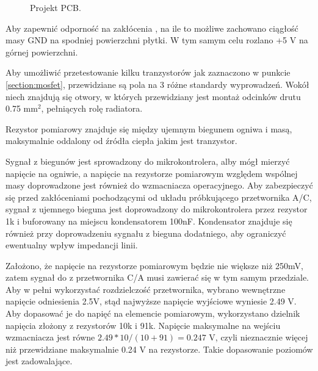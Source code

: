 \documentclass[polish,engineer]{polsl-msth}
\begin{document}
\begin{figure}[hbtp]
     \caption{Projekt PCB. \label{img:pcb_colored}}
\end{figure}

Aby zapewnić odporność na zakłócenia , na ile to możliwe zachowano ciągłość masy GND na spodniej powierzchni płytki. W tym samym celu rozlano +5 V na górnej powierzchni. 

Aby umożliwić przetestowanie kilku tranzystorów jak zaznaczono w punkcie \ref{section:mosfet}, przewidziane są pola na 3 różne standardy wyprowadzeń. Wokół niech znajdują się otwory, w których przewidziany jest montaż odcinków drutu 0.75 mm$^2$, pełniących rolę radiatora.

Rezystor pomiarowy znajduje się między ujemnym biegunem ogniwa i masą, maksymalnie oddalony od źródła ciepła jakim jest tranzystor. 

Sygnał z biegunów jest sprowadzony do mikrokontrolera, alby mógł mierzyć napięcie na ogniwie, a napięcie na rezystorze pomiarowym względem wspólnej masy doprowadzone jest również do wzmacniacza operacyjnego. Aby zabezpieczyć się przed zakłóceniami pochodzącymi od układu próbkującego przetwornika A/C, sygnał z ujemnego bieguna jest doprowadzony do mikrokontrolera przez rezystor 1k i buforowany na miejscu kondensatorem 100nF. Kondensator znajduje się również przy doprowadzeniu sygnału z bieguna dodatniego, aby ograniczyć ewentualny wpływ impedancji linii.

Założono, że napięcie na rezystorze pomiarowym będzie nie większe niż 250mV, zatem sygnał do z przetwornika C/A musi zawierać się w tym samym przedziale. Aby w pełni wykorzystać rozdzielczość przetwornika, wybrano wewnętrzne napięcie odniesienia 2.5V, stąd najwyższe napięcie wyjściowe wyniesie 2.49 V. Aby dopasować je do napięć na elemencie pomiarowym, wykorzystano dzielnik napięcia złożony z rezystorów 10k i 91k. Napięcie maksymalne na wejściu wzmacniacza jest równe $2.49*10/(10+91) = 0.247$ V, czyli nieznacznie więcej niż przewidziane maksymalnie 0.24 V na rezystorze. Takie dopasowanie poziomów jest zadowalające.
\end{document}
